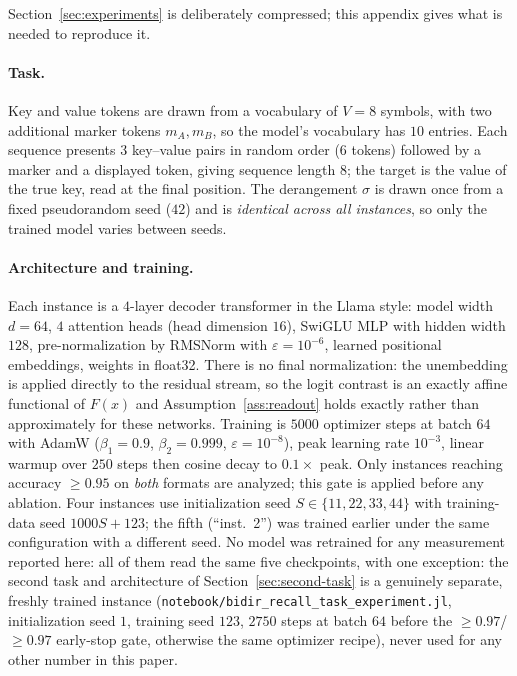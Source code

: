 \documentclass[11pt,a4paper]{article}
\begin{document}
Section~\ref{sec:experiments} is deliberately compressed; this appendix gives
what is needed to reproduce it.

\paragraph{Task.} Key and value tokens are drawn from a vocabulary of
$V=8$ symbols, with two additional marker tokens $m_A,m_B$, so the model's
vocabulary has $10$ entries. Each sequence presents $3$ key--value pairs in
random order ($6$ tokens) followed by a marker and a displayed token, giving
sequence length $8$; the target is the value of the true key, read at the
final position. The derangement $\sigma$ is drawn once from a fixed
pseudorandom seed ($42$) and is \emph{identical across all instances}, so only
the trained model varies between seeds.

\paragraph{Architecture and training.} Each instance is a $4$-layer decoder
transformer in the Llama style: model width $d=64$, $4$ attention heads
(head dimension $16$), SwiGLU MLP with hidden width $128$, pre-normalization
by RMSNorm with $\varepsilon=10^{-6}$, learned positional embeddings, weights
in float32. There is no final normalization: the unembedding is applied
directly to the residual stream, so the logit contrast is an exactly affine
functional of $F(x)$ and Assumption~\ref{ass:readout} holds exactly rather
than approximately for these networks. Training is $5000$ optimizer steps at batch $64$ with AdamW
($\beta_1=0.9$, $\beta_2=0.999$, $\varepsilon=10^{-8}$), peak learning rate
$10^{-3}$, linear warmup over $250$ steps then cosine decay to
$0.1\times$ peak. Only instances reaching accuracy $\ge0.95$ on \emph{both}
formats are analyzed; this gate is applied before any ablation. Four
instances use initialization seed $S\in\{11,22,33,44\}$ with training-data
seed $1000S+123$; the fifth (``inst.\ 2'') was trained earlier under the same
configuration with a different seed. No model was retrained for any
measurement reported here: all of them read the same five checkpoints,
with one exception: the second task and architecture of
Section~\ref{sec:second-task} is a genuinely separate, freshly trained
instance (\texttt{notebook/\allowbreak bidir\_recall\_task\_experiment.jl},
initialization seed $1$, training seed $123$, $2750$ steps at batch $64$ before the
$\ge0.97$/$\ge0.97$ early-stop gate, otherwise the same optimizer recipe),
never used for any other number in this paper.
\end{document}
